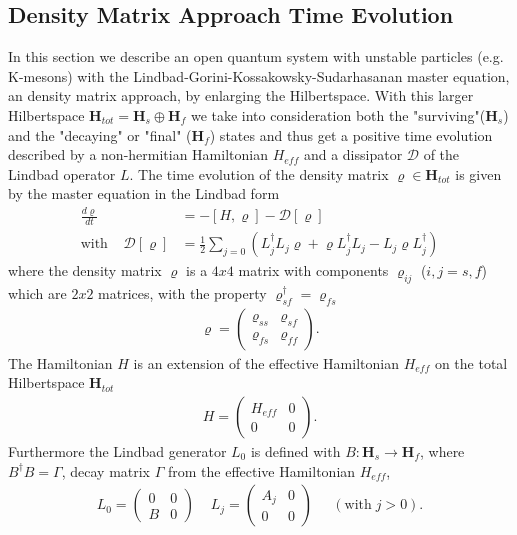 \documentclass[a4paper]{article}
\begin{document}
\subsection{Density Matrix Approach Time Evolution}
In this section we describe an open quantum system with unstable particles
(e.g. K-mesons) with the Lindbad-Gorini-Kossakowsky-Sudarhasanan master equation,
an density matrix approach, by enlarging the Hilbertspace\cite{bgh}. With this
larger Hilbertspace $\textbf{H}_{tot} = \textbf{H}_s \oplus \textbf{H}_f$ we take
into consideration both the "surviving"($\textbf{H}_s$) and the "decaying" or
"final" ($\textbf{H}_f$)
states and thus get a positive time evolution described by a non-hermitian
Hamiltonian $H_{eff}$ and a dissipator $\mathcal{D}$ of the Lindbad operator
$L$. The time evolution of the density matrix $\varrho \in \mathbf{H}_{tot}$ is given by the master
equation in the Lindbad form
\begin{align}\label{eq:master}
    \frac{d\varrho}{dt} &= -[H, \varrho] - \mathcal{D}[\varrho]\\
    \text{with}\;\;\;\;    \mathcal{D}[\varrho] &= \frac{1}{2} \sum_{j=0} (L^{\dagger}_j L_j \varrho + \varrho
    L^{\dagger}_j L_j - L_j \varrho L^{\dagger}_j)
\end{align}
where the density matrix $\varrho$ is a $4x4$ matrix with components
$\varrho_{ij}$ ($i,j = s,f$) which are $2x2$ matrices, with the property
$\varrho^\dagger_{sf} = \varrho_{fs}$
\begin{align}
    \varrho =
    \begin{pmatrix}
        \varrho_{ss} &  \varrho_{sf} \\
        \varrho_{fs} &  \varrho_{ff}
    \end{pmatrix}.
\end{align}
The Hamiltonian $H$ is an extension of the effective Hamiltonian $H_{eff}$ on
the total Hilbertspace $\textbf{H}_{tot}$
\begin{align}
    H =
    \begin{pmatrix}
        H_{eff} &  0 \\
        0 &  0
    \end{pmatrix}.
\end{align}
Furthermore the Lindbad generator $L_0$ is defined with
$B:\textbf{H}_s \rightarrow \textbf{H}_f$, where $B^\dagger B = \Gamma$, decay
matrix $\Gamma$ from the effective Hamiltonian $H_{eff}$,
\begin{align}
    L_0 =
    \begin{pmatrix}
        0 &  0 \\
        B &  0
    \end{pmatrix} \;\;\;\;
    L_j =
    \begin{pmatrix}
        A_j &  0 \\
        0 &  0
    \end{pmatrix} \;\;\;\;\;  (\text{with}\; j > 0).
\end{align}
\end{document}
